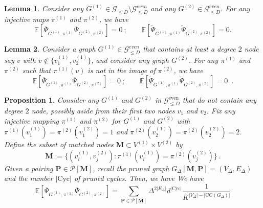 \documentclass{article}
\newtheorem{proposition}{Proposition}
\newtheorem{lemma}{Lemma}
\begin{document}
\begin{lemma}\label{lem:covariance_degree_odd}
    Consider any $G^{(1)}\in \mathcal{G}_{\leq D}\setminus \mathcal{G}^{even}_{\leq D}$ and any $G^{(2)}\in \mathcal{G}^{even}_{\leq D}$.  For any injective maps $\pi^{(1)}$ and $\pi^{(2)}$, we have 
   \[
   \mathbb{E}[\overline{\Psi}_{G^{(1)},\pi^{(1)}} \overline{\Psi}_{G^{(2)},\pi^{(2)}}]=0\ ; \quad \quad  \mathbb{E}[\widetilde{\Psi}_{G^{(1)},\pi^{(1)}} \widetilde{\Psi}_{G^{(2)},\pi^{(2)}}]=0.
    \]
   \end{lemma}
   

   


\begin{lemma}\label{lem:covariance_degree2}
 Consider a graph $G^{(1)}\in \mathcal{G}^{even}_{\leq D}$ that contains at least a degree $2$ node say $v$ with $v\notin\{v^{(1)}_1,v^{(1)}_2\}$, and consider any graph $G^{(2)}$. For any $\pi^{(1)}$ and $\pi^{(2)}$ such that $\pi^{(1)}(v)$ is not in the image of $\pi^{(2)}$, we have 
\[
\mathbb{E}[\overline{\Psi}_{G^{(1)},\pi^{(1)}} \overline{\Psi}_{G^{(2)},\pi^{(2)}}]=0\  ; \quad \quad  \mathbb{E}[\widetilde{\Psi}_{G^{(1)},\pi^{(1)}} \widetilde{\Psi}_{G^{(2)},\pi^{(2)}}]=0\enspace . 
 \]
\end{lemma}



\begin{proposition}\label{prop:covariance_without_degree_2}
    Consider any $G^{(1)}$ and $G^{(2)}$ in $\mathcal{G}_{\leq D}^{\mathrm{even}}$ that do not contain any degree $2$ node, possibly aside from their first two nodes $v_1$ and $v_2$. Fix any injective mapping $\pi^{(1)}$ and $\pi^{(2)}$ for $G^{(1)}$ and $G^{(2)}$ with $\pi^{(1)}(v^{(1)}_1)=\pi^{(2)}(v^{(2)}_1)=1$ and   $\pi^{(2)}(v^{(1)}_2)=\pi^{(2)}(v^{(2)}_2)=2$. Define the subset of matched nodes $\mathbf{M}\subset V^{(1)}\times  V^{(2)}$ by 
    \[
    \mathbf{M}:= \{(v^{(1)}_i,v^{(2)}_j): \pi^{(1)}(v_i^{(1)})= \pi^{(2)}(v_j^{(2)}) \} \ . 
    \]
 Given a pairing $\mathbf{P}\in \mathcal{P}[\mathbf{M}]$, recall the pruned graph $G_{\Delta}[\mathbf{M},\mathbf{P}]= (V_{\Delta},E_{\Delta})$ and the number $|\mathrm{Cyc}|$ of pruned cycles. Then, we have 
    We have 
        \[
            \mathbb{E}[\overline{\Psi}_{G^{(1)},\pi^{(1)}} \overline{\Psi}_{G^{(2)},\pi^{(2)}}]= \sum_{\mathbf{P}\in \mathcal{P}[\mathbf{M}]}\Delta^{2|E_{\Delta}|}d^{|\mathrm{Cyc}|}\frac{1}{K^{|V_{\Delta}|-|\mathrm{CC}(G_{\Delta})|}}
        \]
    \end{proposition}
    
\end{document}
